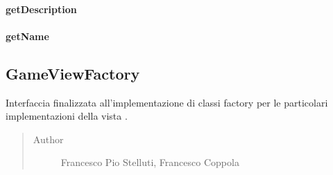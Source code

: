 \documentclass[letterpaper,10pt,italian,openany,oneside]{sphinxmanual}
\begin{document}
\paragraph{getDescription}
\label{\detokenize{test/it/unicam/cs/pa/mastermind/factories/DonaldKnuthBreakerFactory:getdescription}}

\begin{fulllineitems}
\label{\detokenize{test/it/unicam/cs/pa/mastermind/factories/DonaldKnuthBreakerFactory:it.unicam.cs.pa.mastermind.factories.DonaldKnuthBreakerFactory.getDescription()}}
\end{fulllineitems}



\paragraph{getName}
\label{\detokenize{test/it/unicam/cs/pa/mastermind/factories/DonaldKnuthBreakerFactory:getname}}

\begin{fulllineitems}
\label{\detokenize{test/it/unicam/cs/pa/mastermind/factories/DonaldKnuthBreakerFactory:it.unicam.cs.pa.mastermind.factories.DonaldKnuthBreakerFactory.getName()}}
\end{fulllineitems}



\subsection{GameViewFactory}
\label{\detokenize{test/it/unicam/cs/pa/mastermind/factories/GameViewFactory:gameviewfactory}}\label{\detokenize{test/it/unicam/cs/pa/mastermind/factories/GameViewFactory::doc}}

\begin{fulllineitems}
\label{\detokenize{test/it/unicam/cs/pa/mastermind/factories/GameViewFactory:it.unicam.cs.pa.mastermind.factories.GameViewFactory}}
Interfaccia finalizzata all’implementazione di classi factory per le particolari implementazioni della vista .
\begin{quote}\begin{description}
\item[{Author}] \leavevmode
Francesco Pio Stelluti, Francesco Coppola

\end{description}\end{quote}

\end{fulllineitems}
\end{document}
